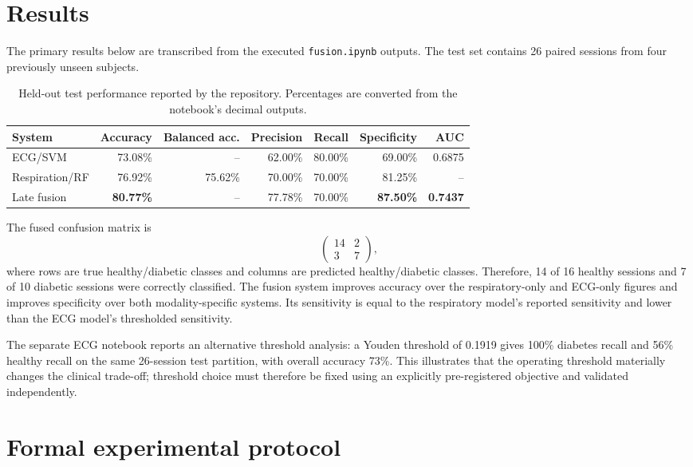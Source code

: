 \documentclass[11pt,a4paper]{article}
\begin{document}
\section{Results}
The primary results below are transcribed from the executed \texttt{fusion.ipynb} outputs. The test set contains 26 paired sessions from four previously unseen subjects.

\begin{table}[H]
\centering
\caption{Held-out test performance reported by the repository. Percentages are converted from the notebook's decimal outputs.}
\label{tab:results}
\begin{tabular}{lrrrrrr}
\toprule
\textbf{System} & \textbf{Accuracy} & \textbf{Balanced acc.} & \textbf{Precision} & \textbf{Recall} & \textbf{Specificity} & \textbf{AUC}\\
\midrule
ECG/SVM & 73.08\% & -- & 62.00\% & 80.00\% & 69.00\% & 0.6875\\
Respiration/RF & 76.92\% & 75.62\% & 70.00\% & 70.00\% & 81.25\% & --\\
Late fusion & \textbf{80.77\%} & -- & 77.78\% & 70.00\% & \textbf{87.50\%} & \textbf{0.7437}\\
\bottomrule
\end{tabular}
\end{table}

The fused confusion matrix is
\[
\begin{pmatrix}
14 & 2\\
3 & 7
\end{pmatrix},
\]
where rows are true healthy/diabetic classes and columns are predicted healthy/diabetic classes. Therefore, 14 of 16 healthy sessions and 7 of 10 diabetic sessions were correctly classified. The fusion system improves accuracy over the respiratory-only and ECG-only figures and improves specificity over both modality-specific systems. Its sensitivity is equal to the respiratory model's reported sensitivity and lower than the ECG model's thresholded sensitivity.

The separate ECG notebook reports an alternative threshold analysis: a Youden threshold of 0.1919 gives 100\% diabetes recall and 56\% healthy recall on the same 26-session test partition, with overall accuracy 73\%. This illustrates that the operating threshold materially changes the clinical trade-off; threshold choice must therefore be fixed using an explicitly pre-registered objective and validated independently.


\section{Formal experimental protocol}
\end{document}
